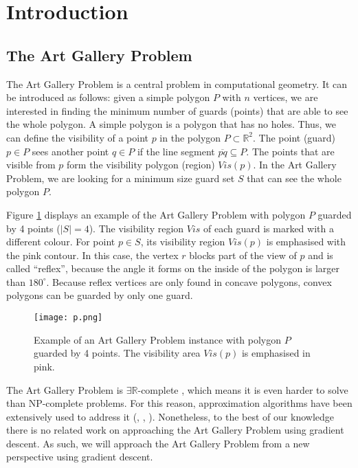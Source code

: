 \section{Introduction}
\subsection{The Art Gallery Problem}

The Art Gallery Problem \cite{o1987art} is a central problem in computational geometry. It can be introduced as follows: given a simple polygon $P$ with $n$ vertices, we are interested in finding the minimum number of guards (points) that are able to see the whole polygon. A simple polygon is a polygon that has no holes. Thus, we can define the visibility of a point $p$ in the polygon $P \subset \mathbb R^2$. The point (guard) $p \in P$ sees another point $q \in P$ if the line segment $\overline{pq} \subseteq P$. The points that are visible from $p$ form the visibility polygon (region) $Vis(p)$. In the Art Gallery Problem, we are looking for a minimum size guard set $S$ that can see the whole polygon $P$.

Figure \ref{fig:art} displays an example of the Art Gallery Problem \cite{o1987art} with polygon $P$ guarded by 4 points ($|S| = 4$). The visibility region $Vis$ of each guard is marked with a different colour. For point $p \in S$, its visibility region $Vis(p)$ is emphasised with the pink contour. In this case, the vertex $r$ blocks part of the view of $p$ and is called ``reflex'', because the angle it forms on the inside of the polygon is larger than $180^\circ$. Because reflex vertices are only found in concave polygons, convex polygons can be guarded by only one guard.

\begin{figure}[h!]
    \centering
    \texttt{[image: p.png]}
    \caption{Example of an Art Gallery Problem instance with polygon $P$ guarded by 4 points. The visibility area $Vis(p)$ is emphasised in pink.}
    \label{fig:art}
\end{figure}

The Art Gallery Problem \cite{o1987art} is $\exists \mathbb R$-complete \cite{abrahamsen2021art}, which means it is even harder to solve than NP-complete problems. For this reason, approximation algorithms have been extensively used to address it (\cite{DBLP:journals/corr/BonnetM16b}, \cite{GHOSH2010718}, \cite{DBLP:journals/corr/abs-2007-06920}). Nonetheless, to the best of our knowledge there is no related work on approaching the Art Gallery Problem \cite{o1987art} using gradient descent. As such, we will approach the Art Gallery Problem \cite{o1987art} from a new perspective using gradient descent.

